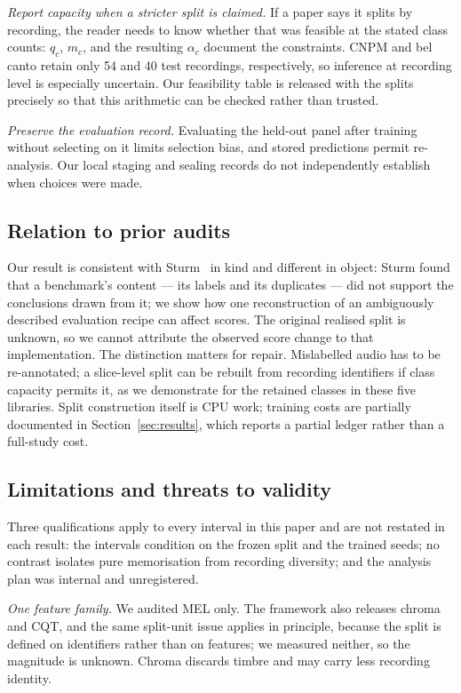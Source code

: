 \emph{Report capacity when a stricter split is claimed.} If a paper says it splits by recording,
the reader needs to know whether that was feasible at the stated class counts: $q_c$,
$m_c$, and the resulting $\alpha_c$ document the constraints. CNPM and bel canto retain only
54 and 40 test recordings, respectively, so inference at recording level is especially uncertain. Our feasibility table is released with the splits precisely so that this
arithmetic can be checked rather than trusted.

\emph{Preserve the evaluation record.} Evaluating the held-out panel after training without
selecting on it limits selection bias, and stored predictions permit re-analysis. Our local
staging and sealing records do not independently establish when choices were made.

\subsection{Relation to prior audits}

Our result is consistent with Sturm~\cite{sturm2012gtzan} in kind and different in object: Sturm found
that a benchmark's content --- its labels and its duplicates --- did not support the conclusions drawn from it; we
show how one reconstruction of an ambiguously described evaluation recipe can affect scores.
The original realised split is unknown, so we cannot attribute the observed score change to that implementation.
The distinction matters for repair. Mislabelled audio has to be re-annotated; a
slice-level split can be rebuilt from recording identifiers if class capacity permits it, as
we demonstrate for the retained classes in these five libraries. Split construction itself is
CPU work; training costs are partially documented in Section~\ref{sec:results}, which reports a partial
ledger rather than a full-study cost.

\subsection{Limitations and threats to validity}

Three qualifications apply to every interval in this paper and are not restated in each result:
the intervals condition on the frozen split and the trained seeds; no contrast isolates pure
memorisation from recording diversity; and the analysis plan was internal and unregistered.

\emph{One feature family.} We audited MEL only. The framework also releases chroma and CQT, and
the same split-unit issue applies in principle, because the split is defined on identifiers
rather than on features; we measured neither, so the magnitude is unknown. Chroma discards
timbre and may carry less recording identity.

